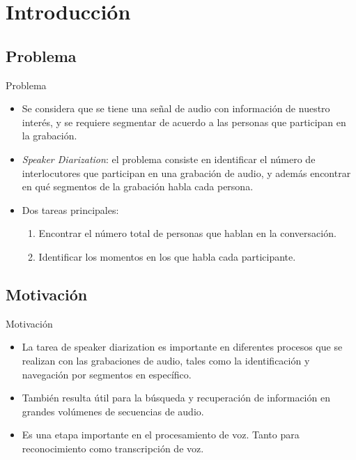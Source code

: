

\section{Introducción}

\subsection{Problema}
\begin{frame}{}{Problema}

\begin{itemize}
    \itemsep1em
    \item Se considera que se tiene una señal de audio con información de nuestro interés, y se requiere segmentar de acuerdo a las personas que participan en la grabación.

    \item \textit{Speaker Diarization}: el problema consiste en identificar el número de interlocutores que participan en una grabación de audio, y además encontrar en qué segmentos de la grabación habla cada persona.

    \item Dos tareas principales: 
    \begin{enumerate}
        \item Encontrar el número total de personas que hablan en la conversación.
        \item Identificar los momentos en los que habla cada participante.
    \end{enumerate}
  \end{itemize}

\end{frame}

\subsection{Motivación}

\begin{frame}{Motivación}
  \begin{itemize}
    \itemsep1em
    \item  La tarea de speaker diarization es importante en diferentes procesos que se realizan con las grabaciones de audio, tales como la identificación y navegación por segmentos en específico.

    \item También resulta útil para la búsqueda y recuperación de información en grandes volúmenes de secuencias de audio.
  
    \item Es una etapa importante en el procesamiento de voz. Tanto para reconocimiento como transcripción de voz.
    
  \end{itemize}
\end{frame}

